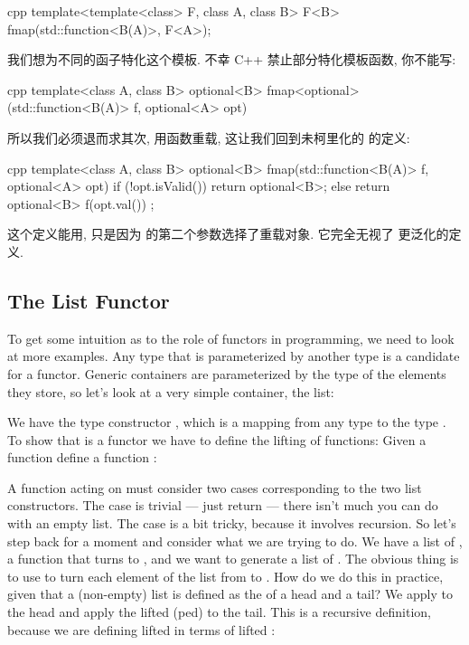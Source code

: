\begin{snip}{cpp}
template<template<class> F, class A, class B>
F<B> fmap(std::function<B(A)>, F<A>);
\end{snip}
我们想为不同的函子特化这个模板. 不幸 C++ 禁止部分特化模板函数, 你不能写:

\begin{snip}{cpp}
template<class A, class B>
optional<B> fmap<optional>(std::function<B(A)> f, optional<A> opt)
\end{snip}
所以我们必须退而求其次, 用函数重载, 这让我们回到未柯里化的  的定义:

\begin{snip}{cpp}
template<class A, class B>
optional<B> fmap(std::function<B(A)> f, optional<A> opt) {
    if (!opt.isValid())
        return optional<B>{};
    else
        return optional<B>{ f(opt.val()) };
}
\end{snip}
这个定义能用, 只是因为  的第二个参数选择了重载对象. 它完全无视了  更泛化的定义.

\subsection{The List Functor}

To get some intuition as to the role of functors in programming, we need
to look at more examples. Any type that is parameterized by another type
is a candidate for a functor. Generic containers are parameterized by
the type of the elements they store, so let's look at a very simple
container, the list:

We have the type constructor , which is a mapping from any
type  to the type . To show that 
is a functor we have to define the lifting of functions: Given a
function  define a function
:

A function acting on  must consider two cases
corresponding to the two list constructors. The  case is
trivial --- just return  --- there isn't much you can do
with an empty list. The  case is a bit tricky, because it
involves recursion. So let's step back for a moment and consider what we
are trying to do. We have a list of , a function 
that turns  to , and we want to generate a list of
. The obvious thing is to use  to turn each element
of the list from  to . How do we do this in
practice, given that a (non-empty) list is defined as the 
of a head and a tail? We apply  to the head and apply the
lifted (ped)  to the tail. This is a recursive
definition, because we are defining lifted  in terms of lifted
:

